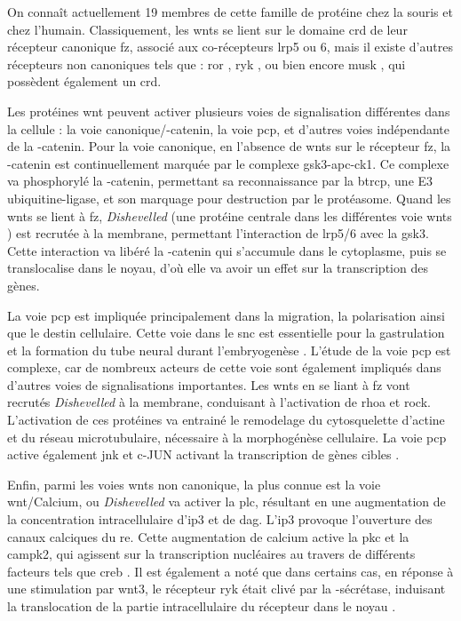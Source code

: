 	On connaît actuellement 19 membres de cette famille de protéine chez la souris et chez l'humain. Classiquement, les \Glspl{wnt} se lient sur le domaine \gls{crd} de leur récepteur canonique \gls{fz}, associé aux co-récepteurs \gls{lrp}5 ou 6, mais il existe d'autres récepteurs non canoniques tels que : \gls{ror} \cite{Cadigan2006, Gordon2006, Green2008}, \gls{ryk} \cite{Bovolenta2006, Fradkin2010}, ou bien encore \gls{musk} \cite{Jing2009}, qui possèdent également un \gls{crd}.
	
	Les protéines \gls{wnt} peuvent activer plusieurs voies de signalisation différentes dans la cellule :  la voie canonique/\textbeta{}-catenin, la voie \gls{pcp}, et d'autres voies indépendante de la \textbeta{}-catenin. Pour la voie canonique, en l'absence de \Glspl{wnt} sur le récepteur \gls{fz}, la \textbeta{}-catenin est continuellement marquée par le complexe \acrshort{gsk3}-\acrshort{apc}-\acrshort{ck1}. Ce complexe va phosphorylé la \textbeta{}-catenin, permettant sa reconnaissance par la \gls{btrcp}, une E3 ubiquitine-ligase, et son marquage pour destruction par le protéasome. Quand les \Glspl{wnt} se lient à \gls{fz}, \emph{Dishevelled} (une protéine centrale dans les différentes voie \glspl{wnt} \cite{Gao2010}) est recrutée à la membrane, permettant l'interaction de \gls{lrp}5/6 avec la \gls{gsk3}. Cette interaction va libéré la \textbeta{}-catenin qui s'accumule dans le cytoplasme, puis se translocalise dans le noyau, d'où elle va avoir un effet sur la transcription des gènes. 
	
	La voie \gls{pcp} est impliquée principalement dans la migration, la polarisation ainsi que le destin cellulaire. Cette voie dans le \gls{snc} est essentielle pour la gastrulation et la formation du tube neural durant l'embryogenèse \cite{Adler2002, Nejsum2009}. L'étude de la voie \gls{pcp} est complexe, car de nombreux acteurs de cette voie sont également impliqués dans d'autres voies de signalisations importantes. Les \Glspl{wnt} en se liant à \gls{fz} vont recrutés \emph{Dishevelled} à la membrane, conduisant à l'activation de \acrshort{rhoa} et \gls{rock}. L'activation de ces protéines va entrainé le remodelage du cytosquelette d'actine et du réseau microtubulaire, nécessaire à la morphogénèse cellulaire. La voie \gls{pcp} active également \acrshort{jnk} et c-JUN activant la transcription de gènes cibles \cite{Niehrs2012}.
	
	Enfin, parmi les voies \glspl{wnt} non canonique, la plus connue est la voie \Gls{wnt}/Calcium, ou \emph{Dishevelled} va activer la \acrshort{plc}, résultant en une augmentation de la concentration intracellulaire d'\acrshort{ip3} et de \acrshort{dag}. L'\acrshort{ip3} provoque l'ouverture des canaux calciques du \gls{re}. Cette augmentation de calcium active la \acrshort{pkc} et la \acrshort{campk2}, qui agissent sur la transcription nucléaires au travers de différents facteurs tels que \acrshort{creb} \cite{Koles2012}. Il est également a noté que dans certains cas, en réponse à une stimulation par \Gls{wnt}3, le récepteur \gls{ryk} était clivé par la \textgamma{}-sécrétase, induisant la translocation de la partie intracellulaire du récepteur dans le noyau \cite{Lyu2008}.
	

